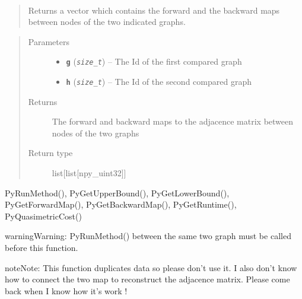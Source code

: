 \documentclass[letterpaper,10pt,english]{sphinxmanual}
\begin{document}
\begin{fulllineitems}
\label{doc:PythonGedLib.PyGetAllMap}~\begin{quote}

Returns a vector which contains the forward and the backward maps between nodes of the two indicated graphs.
\end{quote}
\begin{quote}\begin{description}
\item[{Parameters}] \leavevmode\begin{itemize}
\item {} 
\textbf{\texttt{g}} (\emph{\texttt{size\_t}}) -- The Id of the first compared graph

\item {} 
\textbf{\texttt{h}} (\emph{\texttt{size\_t}}) -- The Id of the second compared graph

\end{itemize}

\item[{Returns}] \leavevmode
The forward and backward maps to the adjacence matrix between nodes of the two graphs

\item[{Return type}] \leavevmode
list{[}list{[}npy\_uint32{]}{]}

\end{description}\end{quote}




PyRunMethod(), PyGetUpperBound(), PyGetLowerBound(),  PyGetForwardMap(), PyGetBackwardMap(), PyGetRuntime(), PyQuasimetricCost()



\begin{notice}{warning}{Warning:}
PyRunMethod() between the same two graph must be called before this function.
\end{notice}

\begin{notice}{note}{Note:}
This function duplicates data so please don't use it. I also don't know how to connect the two map to reconstruct the adjacence matrix. Please come back when I know how it's work !
\end{notice}

\end{fulllineitems}

\end{document}

